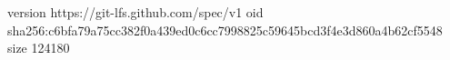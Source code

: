 version https://git-lfs.github.com/spec/v1
oid sha256:c6bfa79a75cc382f0a439ed0c6cc7998825c59645bcd3f4e3d860a4b62cf5548
size 124180
